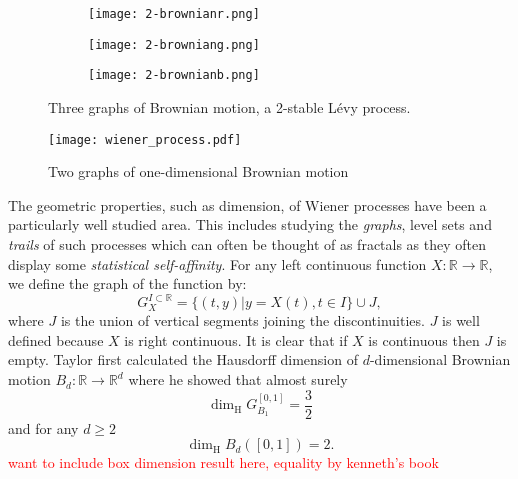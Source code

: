 \begin{figure}[htbp]
	\centering
	\begin{subfigure}{0.3\textwidth}
		\centering
		\texttt{[image: 2-brownianr.png]}
	\end{subfigure}%
	\begin{subfigure}{.3\textwidth}
		\centering
		\texttt{[image: 2-browniang.png]}
	\end{subfigure}%
	\begin{subfigure}{.3\textwidth}
		\centering
		\texttt{[image: 2-brownianb.png]}
	\end{subfigure}
	\caption{Three graphs of Brownian motion, a 2-stable L\'evy process.}
	\label{fig:brownian}
\end{figure}



\begin{figure}[h]
	\texttt{[image: wiener\_process.pdf]}
	\caption{\label{fig:brownianmotion}Two graphs of one-dimensional Brownian motion}
\end{figure}

The geometric properties, such as dimension, of Wiener processes have been a particularly well studied area. This includes studying the \emph{graphs}, level sets and \emph{trails} of such processes which can often be thought of as fractals as they often display some \emph{statistical self-affinity}. For any left continuous function $X:\mathbb{R}\to\mathbb{R}$, we define the graph of the function by:
\[
G^{I\subset\mathbb{R}}_{X}=\{(t,y)|y=X(t),t\in I\}\cup J,
\]
where $J$ is the union of vertical segments joining the discontinuities. $J$ is well defined because $X$ is right continuous. It is clear that if $X$ is continuous then $J$ is empty. Taylor \cite{Ta} first calculated the Hausdorff dimension of $d$-dimensional Brownian motion $B_d:\mathbb{R}\to\mathbb{R}^d$ where he showed that almost surely
\[
\dim_\text{H} G_{B_1}^{[0,1]} =  \frac{3}{2}         
\]
and for any $d\ge 2$
\[
\dim_\text{H} B_d([0,1]) =  2.
\]
\textcolor{red}{want to include box dimension result here, equality by kenneth's book}


